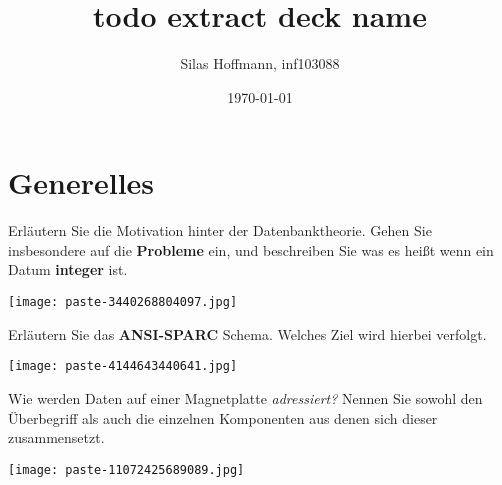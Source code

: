 \documentclass{article}
\title{todo extract deck name}
\author{Silas Hoffmann, inf103088}
\date{\today}
\begin{document}
\maketitle
\clearpage
\tableofcontents
\clearpage

\section{Generelles}
\begin{tcolorbox}[colback=white!10!white,colframe=lightgray!75!black,
  savelowerto=\jobname_ex.tex,breakable,enhanced,lines before break=40]

\begin{center}
 Erläutern Sie die Motivation hinter der Datenbanktheorie. Gehen Sie insbesondere auf die 
\textbf{Probleme
} ein, und beschreiben Sie was es heißt wenn ein Datum 
\textbf{integer
}ist. 

\end{center}

\tcblower

\justifying
\texttt{[image: paste-3440268804097.jpg]}

\end{tcolorbox}
\begin{tcolorbox}[colback=white!10!white,colframe=lightgray!75!black,
  savelowerto=\jobname_ex.tex,breakable,enhanced,lines before break=40]

\begin{center}
 Erläutern Sie das 
\textbf{ANSI-SPARC
}Schema. Welches Ziel wird hierbei verfolgt. 

\end{center}

\tcblower

\justifying
\texttt{[image: paste-4144643440641.jpg]}

\end{tcolorbox}
\begin{tcolorbox}[colback=white!10!white,colframe=lightgray!75!black,
  savelowerto=\jobname_ex.tex,breakable,enhanced,lines before break=40]

\begin{center}
 Wie werden Daten auf einer Magnetplatte 
\textit{adressiert?
}Nennen Sie sowohl den Überbegriff als auch die einzelnen Komponenten aus denen sich dieser zusammensetzt. 

\end{center}

\tcblower

\justifying
\texttt{[image: paste-11072425689089.jpg]}

\end{tcolorbox}
\end{document}
